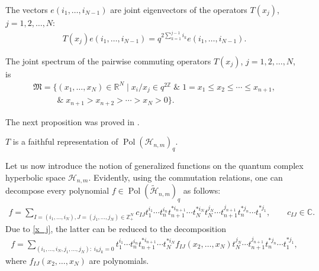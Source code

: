 The vectors $e(i_1,\ldots,i_{N-1})$ are joint eigenvectors of the operators $T(x_j)$, $j=1,2,\ldots,N$:
\begin{gather*}%
T(x_j)e(i_1,\ldots,i_{N-1})= q^{2\sum\limits_{k=1}^{j-1}i_k}e(i_1,\ldots,i_{N-1}).
\end{gather*}

The joint spectrum of the pairwise commuting operators $T(x_j)$, $j=1,2,\ldots,N$, is
\begin{gather*}
\mathfrak{M}=\big\{(x_1,\ldots,x_N)\in\mathbb{R}^N \;| \; x_i/x_j\in q^{2\mathbb{Z}}\;\&\;1=x_1\le x_2\le\cdots\le
x_{n+1}, \\
\phantom{\mathfrak{M}=\big\{}{} \&\; x_{n+1}>x_{n+2}>\cdots>x_N>0\big\}.
\end{gather*}

The next proposition was proved in \cite{BS}.

\begin{proposition}
$T$ is a faithful representation of $\operatorname{Pol}(\mathscr{H}_{n,m})_q$.
\end{proposition}



Let us now introduce the notion of generalized functions on the quantum complex hyperbolic space
$\mathscr{H}_{n,m}$. Evidently, using the commutation relations, one can decompose every polynomial $f \in
\operatorname{Pol}(\widetilde{\mathscr{H}}_{n,m})_q$ as follows:
\begin{gather}\label{decomp_pol_Hnm_0}
f= \!\!\!\sum_{I=(i_1,\ldots,i_N), J=(j_1,\ldots,j_N) \in \mathbb Z_+^N}\!\!\! c_{IJ}t_1^{i_1}\cdots
t_n^{i_n}t_{n+1}^{*i_{n+1}}\cdots t_N^{*i_N}t_N^{j_N}\cdots t_{n+1}^{j_{n+1}}t_n^{*j_n}\cdots t_1^{*j_1},
\!\!\!\qquad c_{IJ} \in \mathbb C.\!\!\!
\end{gather}
Due to \eqref{x_j}, the latter can be reduced to the decomposition{\samepage
\begin{gather}\label{decomp_pol_Hnm}
f=\sum_{(i_1,\ldots,i_N,j_1,\ldots,j_N):\;i_kj_k=0} t_1^{i_1}\cdots t_n^{i_n}t_{n+1}^{*i_{n+1}}\cdots
t_N^{*i_N}f_{IJ}(x_2,\ldots,x_N)t_N^{j_N}\cdots t_{n+1}^{j_{n+1}}t_n^{*j_n}\cdots t_1^{*j_1},
\end{gather}
where $f_{IJ}(x_2,\ldots,x_N)$ are polynomials.}

